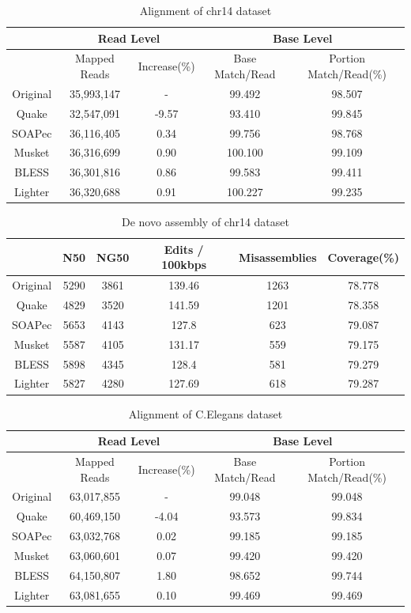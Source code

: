 \documentclass{bmcart}
\begin{document}
\begin{backmatter}
\begin{table}[h!]%
\caption{Alignment of chr14 dataset}
\begin{tabular}{|c|c|c||c|c|}\hline
  & \multicolumn{2}{|c||}{Read Level} & \multicolumn{2}{|c|}{Base Level} \\ \hline
  & Mapped Reads  &Increase(\%) & Base Match/Read	& Portion Match/Read(\%) \\ \hline
Original & 35,993,147	&- 		&	99.492	& 98.507 \\ \hline
Quake 	& 32,547,091	& -9.57 &	93.410	& 99.845 \\ \hline
SOAPec  & 36,116,405  & 0.34 & 99.756 & 98.768 \\ \hline
Musket 	&	36,316,699	& 0.90	& 100.100	& 99.109 \\ \hline
BLESS 	&36,301,816	& 0.86	& 99.583	&	99.411 \\ \hline
Lighter	& 36,320,688 & 0.91	& 100.227	&  99.235 \\ \hline
\end{tabular}
\end{table}

\begin{table}[h!] %
\caption{De novo assembly of chr14 dataset}
\begin{tabular}{|c|c|c|c|c|c|} \hline
	   & N50 &	NG50	& Edits / 100kbps &	Misassemblies	& Coverage(\%) \\ \hline
Original &	5290 & 3861	& 139.46 &1263	& 78.778 \\ \hline
Quake	&	4829 & 3520 & 141.59 & 1201 &	78.358 \\ \hline
SOAPec & 5653	& 4143	& 127.8 &	623	 & 79.087 \\ \hline
Musket	&	5587& 	4105 &	131.17	& 559 &	79.175  \\ \hline
BLESS	&	5898 &	4345 &	128.4	& 581 &	79.279 \\ \hline
Lighter	&	5827 & 4280	& 127.69	& 618 & 79.287 \\ \hline
\end{tabular}
\end{table}

\begin{table}[h!]%
\caption{Alignment of C.Elegans dataset}
\begin{tabular}{|c|c|c||c|c|}\hline
  & \multicolumn{2}{|c||}{Read Level} & \multicolumn{2}{|c|}{Base Level} \\ \hline
  & Mapped Reads  &Increase(\%) & Base Match/Read	& Portion Match/Read(\%) \\ \hline
Original & 63,017,855	& - 	&	99.048	& 99.048 \\ \hline
Quake 	& 60,469,150	& -4.04	&	93.573	& 99.834 \\ \hline
SOAPec  & 63,032,768    & 0.02	& 	99.185	&	99.185 \\ \hline
Musket 	&	63,060,601	&	0.07 &	99.420 & 99.420 \\ \hline
BLESS 	& 64,150,807	& 1.80 &98.652	& 99.744 \\ \hline
Lighter	& 63,081,655	& 0.10	& 99.469 & 99.469 \\ \hline
\end{tabular}
\end{table}


\end{backmatter}
\end{document}
